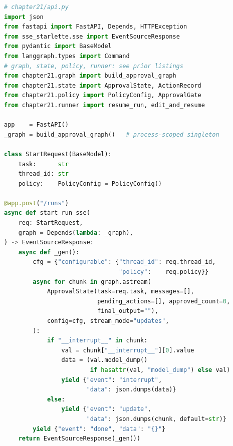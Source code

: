 \begin{lstlisting}[language=Python,
  caption={FastAPI app and SSE endpoint: interrupt event stream},
  label={lst:hitl-api-sse}]
# chapter21/api.py
import json
from fastapi import FastAPI, Depends, HTTPException
from sse_starlette.sse import EventSourceResponse
from pydantic import BaseModel
from langgraph.types import Command
# graph, state, policy, runner: see prior listings
from chapter21.graph import build_approval_graph
from chapter21.state import ApprovalState, ActionRecord
from chapter21.policy import PolicyConfig, ApprovalGate
from chapter21.runner import resume_run, edit_and_resume

app    = FastAPI()
_graph = build_approval_graph()   # process-scoped singleton

class StartRequest(BaseModel):
    task:      str
    thread_id: str
    policy:    PolicyConfig = PolicyConfig()

@app.post("/runs")
async def start_run_sse(
    req: StartRequest,
    graph = Depends(lambda: _graph),
) -> EventSourceResponse:
    async def _gen():
        cfg = {"configurable": {"thread_id": req.thread_id,
                                "policy":    req.policy}}
        async for chunk in graph.astream(
            ApprovalState(task=req.task, messages=[],
                          pending_actions=[], approved_count=0,
                          final_output=""),
            config=cfg, stream_mode="updates",
        ):
            if "__interrupt__" in chunk:
                val = chunk["__interrupt__"][0].value
                data = (val.model_dump()
                        if hasattr(val, "model_dump") else val)
                yield {"event": "interrupt",
                       "data": json.dumps(data)}
            else:
                yield {"event": "update",
                       "data": json.dumps(chunk, default=str)}
        yield {"event": "done", "data": "{}"}
    return EventSourceResponse(_gen())
\end{lstlisting}

